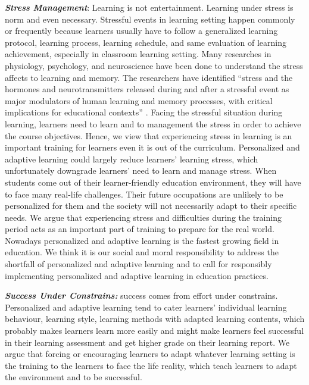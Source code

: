 \documentclass[english]{textolivre}
\begin{document}
\textbf{\emph{Stress Management}}:  Learning is not entertainment. Learning under stress is norm and even necessary. Stressful events in learning setting happen commonly or frequently because learners usually have to follow a generalized learning protocol, learning process, learning schedule, and same evaluation of learning achievement, especially in classroom learning setting. Many researches in physiology, psychology, and neuroscience have been done to understand the stress affects to learning and memory. The researchers have identified “stress and the hormones and neurotransmitters released during and after a stressful event as major modulators of human learning and memory processes, with critical implications for educational contexts” \cite[p. 25]{chang2010}. Facing the stressful situation during learning, learners need to learn and to management the stress in order to achieve the course objectives. Hence, we view that experiencing stress in learning is an important training for learners even it is out of the curriculum. Personalized and adaptive learning could largely reduce learners’ learning stress, which unfortunately downgrade learners’ need to learn and manage stress. When students come out of their learner-friendly education environment, they will have to face many real-life challenges. Their future occupations are unlikely to be personalized for them and the society will not necessarily adapt to their specific needs. We argue that experiencing stress and difficulties during the training period acts as an important part of training to prepare for the real world. Nowadays personalized and adaptive learning is the fastest growing field in education. We think it is our social and moral responsibility to address the shortfall of personalized and adaptive learning and to call for responsibly implementing personalized and adaptive learning in education practices.

\textbf{\emph{Success Under Constrains:}}  success comes from effort under constrains.  Personalized and adaptive learning tend to cater learners’ individual learning behaviour, learning style, learning methods with adapted learning contents, which probably makes learners learn more easily and might make learners feel successful in their learning assessment and get higher grade on their learning report. We argue that forcing or encouraging learners to adapt whatever learning setting is the training to the learners to face the life reality, which teach learners to adapt the environment and to be successful.
\end{document}
